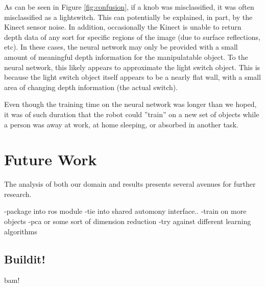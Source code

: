 \documentclass{article}
\begin{document}
As can be seen in Figure \ref{fig:confusion}, if a knob was misclassified, it was often misclassified as a lightswitch. This can potentially be explained, in part, by the Kinect sensor noise. In addition, occasionally the Kinect is unable to return depth data of any sort for specific regions of the image (due to surface reflections, etc). In these cases, the neural network may only be provided with a small amount of meaningful depth information for the manipulatable object. To the neural network, this likely appears to approximate the light switch object. This is because the light switch object itself appears to be a nearly flat wall, with a small area of changing depth information (the actual switch).



Even though the training time on the neural network was longer than we hoped, it was of such duration that the robot could ''train'' on a new set of objects while a person was away at work, at home sleeping, or absorbed in another task.

\section{Future Work}
The analysis of both our domain and results presents several avenues for further research.

-package into ros module
-tie into shared automony interface..
-train on more objects
-pca or some sort of dimension reduction
-try against different learning algorithms

\subsection{Buildit!}
bam!



\end{document}
